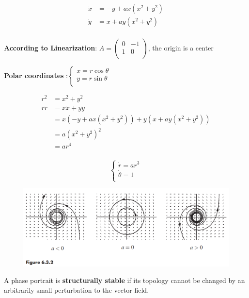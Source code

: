 \documentclass[10pt,aspectratio=43,mathserif,table]{beamer}
\begin{document}
\begin{frame}
    $$
    \begin{aligned}
        \dot{x}&=-y+ax\left( x^2+y^2 \right)\\
        \dot{y}&=x+ay\left( x^2+y^2 \right)\\
    \end{aligned}
    $$

    \textbf{According to Linearization}: $
    A=\left( \begin{matrix}
        0&		-1\\
        1&		0\\
    \end{matrix} \right) 
    $, the origin is a center
    
    \textbf{Polar coordinates} :$
    \begin{cases}
        x=r\cos \theta\\
        y=r\sin \theta\\
    \end{cases}
    $

    $$
    \begin{aligned}
        r^2&=x^2+y^2\\
        r\dot{r}&=x\dot{x}+y\dot{y}\\
        &=x\left( -y+ax\left( x^2+y^2 \right) \right) +y\left( x+ay\left( x^2+y^2 \right) \right)\\
        &=a\left( x^2+y^2 \right) ^2\\
        &=ar^4\\
    \end{aligned}
    $$

    $$
    \begin{cases}
        \dot{r}=ar^3\\
        \dot{\theta}=1\\
    \end{cases}
    $$

\end{frame}

\begin{frame}
    \begin{figure}
        \centering
        \includegraphics[width=\linewidth]{f632.jpg}
    \end{figure}

    A phase portrait is \textbf{structurally stable} if its topology cannot be changed by an arbitrarily small perturbation to the vector field.
\end{frame}
\end{document}
